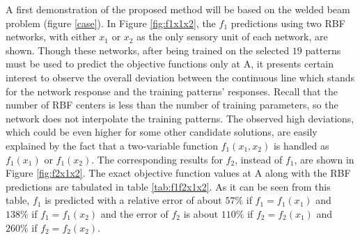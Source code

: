A first demonstration of the proposed method will be based on the welded
beam problem (figure \ref{case}). In Figure \ref{fig:f1x1x2}, the $f_1$ predictions using two RBF networks, with either $x_1$ or $x_2$ as the only sensory unit of each network, are shown. Though these networks, after being trained on the selected $19$ patterns must be used to predict the objective functions only at A, it presents certain interest to observe the overall deviation between the continuous line which stands for the network response and the training patterns' responses. 
Recall that the number of RBF centers is less than the number of training parameters, so the network does not interpolate the training patterns.
The observed high deviations, which could be even higher for some other candidate solutions, are easily explained by the fact that a two-variable function $f_1(x_1,x_2)$ is handled as $f_1(x_1)$ or $f_1(x_2)$. The corresponding results for $f_2$, instead of $f_1$, are shown in Figure \ref{fig:f2x1x2}. 
The exact objective function values at A along with the RBF predictions are tabulated in table \ref{tab:f1f2x1x2}. As it can be seen from this table, $f_1$ is predicted with a relative error of about $57\%$ if $f_1\!=\!f_1(x_1)$ and $138\%$ if $f_1\!=\!f_1(x_2)$ and the error of $f_2$ is about $110\%$ if $ f_2\!=\!f_2(x_1)$ and $260\%$ if $ f_2\!=\!f_2(x_2)$.


